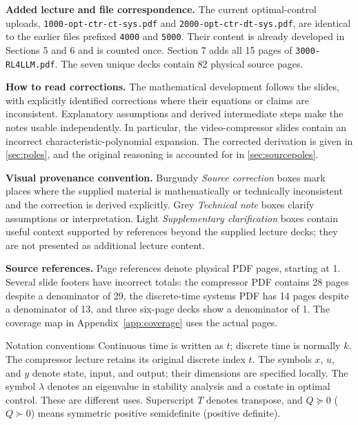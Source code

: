 \documentclass[11pt,a4paper]{article}
\numberwithin{equation}{section}
\numberwithin{figure}{section}
\numberwithin{table}{section}
\begin{document}
\textbf{Added lecture and file correspondence.} The current optimal-control uploads, \texttt{1000-\allowbreak opt-\allowbreak ctr-\allowbreak ct-\allowbreak sys.pdf} and \texttt{2000-\allowbreak opt-\allowbreak ctr-\allowbreak dt-\allowbreak sys.pdf}, are identical to the earlier files prefixed \texttt{4000} and \texttt{5000}. Their content is already developed in Sections 5 and 6 and is counted once. Section 7 adds all 15 pages of \texttt{3000-RL4LLM.pdf}. The seven unique decks contain 82 physical source pages.

\textbf{How to read corrections.} The mathematical development follows the slides, with explicitly identified corrections where their equations or claims are inconsistent. Explanatory assumptions and derived intermediate steps make the notes usable independently. In particular, the video-compressor slides contain an incorrect characteristic-polynomial expansion. The corrected derivation is given in \cref{sec:poles}, and the original reasoning is accounted for in \cref{sec:sourcepoles}.

\textbf{Visual provenance convention.} Burgundy \emph{Source correction} boxes mark places where the supplied material is mathematically or technically inconsistent and the correction is derived explicitly. Grey \emph{Technical note} boxes clarify assumptions or interpretation. Light \emph{Supplementary clarification} boxes contain useful context supported by references beyond the supplied lecture decks; they are not presented as additional lecture content.

\textbf{Source references.} Page references denote physical PDF pages, starting at 1. Several slide footers have incorrect totals: the compressor PDF contains 28 pages despite a denominator of 29, the discrete-time systems PDF has 14 pages despite a denominator of 13, and three six-page decks show a denominator of 1. The coverage map in Appendix~\ref{app:coverage} uses the actual pages.

\begin{concept}{Notation conventions}
Continuous time is written as $t$; discrete time is normally $k$. The compressor lecture retains its original discrete index $t$. The symbols $x$, $u$, and $y$ denote state, input, and output; their dimensions are specified locally. The symbol $\lambda$ denotes an eigenvalue in stability analysis and a costate in optimal control. These are different uses. Superscript $T$ denotes transpose, and $Q\succeq0$ ($Q\succ0$) means symmetric positive semidefinite (positive definite).
\end{concept}
\end{document}
